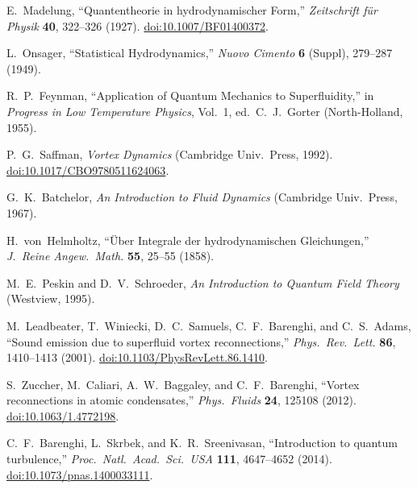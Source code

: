 \documentclass[a4paper,12pt]{article}
\begin{document}
    \begin{thebibliography}{99}

        E.~Madelung, ``Quantentheorie in hydrodynamischer Form,'' \emph{Zeitschrift f\"ur Physik} \textbf{40}, 322--326 (1927). \href{https://doi.org/10.1007/BF01400372}{doi:10.1007/BF01400372}.

        L.~Onsager, ``Statistical Hydrodynamics,'' \emph{Nuovo Cimento} \textbf{6} (Suppl), 279--287 (1949).

        R.~P.~Feynman, ``Application of Quantum Mechanics to Superfluidity,'' in \emph{Progress in Low Temperature Physics}, Vol.~1, ed.\ C.~J.~Gorter (North-Holland, 1955).

        P.~G.~Saffman, \emph{Vortex Dynamics} (Cambridge Univ.\ Press, 1992). \href{https://doi.org/10.1017/CBO9780511624063}{doi:10.1017/CBO9780511624063}.

        G.~K.~Batchelor, \emph{An Introduction to Fluid Dynamics} (Cambridge Univ.\ Press, 1967).

        H.~von~Helmholtz, ``\"Uber Integrale der hydrodynamischen Gleichungen,'' \emph{J.\ Reine Angew.\ Math.} \textbf{55}, 25--55 (1858).

        M.~E.~Peskin and D.~V.~Schroeder, \emph{An Introduction to Quantum Field Theory} (Westview, 1995).

        M.~Leadbeater, T.~Winiecki, D.~C.~Samuels, C.~F.~Barenghi, and C.~S.~Adams,
        ``Sound emission due to superfluid vortex reconnections,''
        \emph{Phys.\ Rev.\ Lett.} \textbf{86}, 1410--1413 (2001).
        \href{https://doi.org/10.1103/PhysRevLett.86.1410}{doi:10.1103/PhysRevLett.86.1410}.

        S.~Zuccher, M.~Caliari, A.~W.~Baggaley, and C.~F.~Barenghi,
        ``Vortex reconnections in atomic condensates,''
        \emph{Phys.\ Fluids} \textbf{24}, 125108 (2012).
        \href{https://doi.org/10.1063/1.4772198}{doi:10.1063/1.4772198}.

        C.~F.~Barenghi, L.~Skrbek, and K.~R.~Sreenivasan,
        ``Introduction to quantum turbulence,''
        \emph{Proc.\ Natl.\ Acad.\ Sci.\ USA} \textbf{111}, 4647--4652 (2014).
        \href{https://doi.org/10.1073/pnas.1400033111}{doi:10.1073/pnas.1400033111}.


\end{thebibliography}
\end{document}
